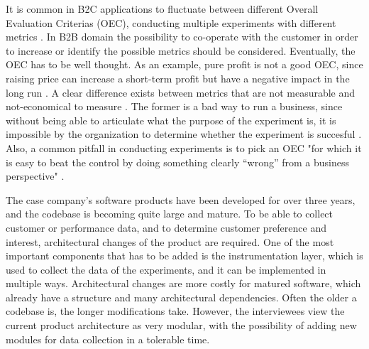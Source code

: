 \documentclass[english]{tktltiki2}
\theoremstyle{definition}
\theoremstyle{remark}
\begin{document}
It is common in B2C applications to fluctuate between different Overall Evaluation Criterias (OEC), conducting multiple experiments with different metrics \cite{kohavi2007practical}. In B2B domain the possibility to co-operate with the customer in order to increase or identify the possible metrics should be considered. Eventually, the OEC has to be well thought. As an example, pure profit is not a good OEC, since raising price can increase a short-term profit but have a negative impact in the long run \cite{kohavi2013online}. A clear difference exists between metrics that are not measurable and not-economical to measure \cite{kohavi2013online}. The former is a bad way to run a business, since without being able to articulate what the purpose of the experiment is, it is impossible by the organization to determine whether the experiment is succesful \cite{kohavi2013online}. Also, a common pitfall in conducting experiments is to pick an OEC "for which it is easy to beat the control by doing something clearly “wrong” from a business perspective" \cite{crook2009seven}.

The case company's software products have been developed for over three years, and the codebase is becoming quite large and mature. To be able to collect customer or performance data, and to determine customer preference and interest, architectural changes of the product are required. One of the most important components that has to be added is the instrumentation layer, which is used to collect the data of the experiments, and it can be implemented in multiple ways. Architectural changes are more costly for matured software, which already have a structure and many architectural dependencies. Often the older a codebase is, the longer modifications take. However, the interviewees view the current product architecture as very modular, with the possibility of adding new modules for data collection in a tolerable time. 

\end{document}
